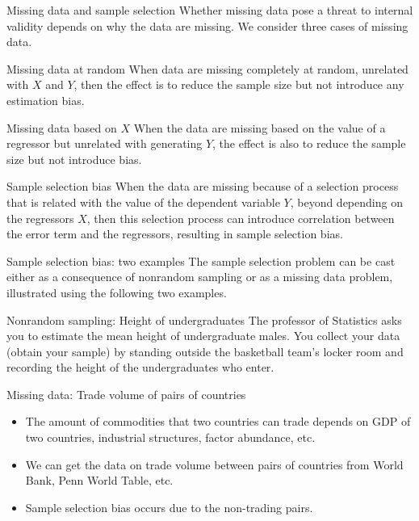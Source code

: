 \documentclass[presentation,10pt]{beamer}
\begin{document}
\begin{frame}[label={sec:orgb2cec50}]{Missing data and sample selection}
Whether missing data pose a threat to internal validity depends on why
the data are missing. We consider three cases of missing data.

\begin{block}{Missing data at random}
When data are missing completely at random, unrelated with \(X\) and
\(Y\), then the effect is to reduce the sample size but not introduce
any estimation bias. 
\end{block}

\begin{block}{Missing data based on \(X\)}
When the data are missing based on the value of a regressor but
unrelated with generating \(Y\), the effect is also to reduce the sample
size but not introduce bias. 
\end{block}

\begin{block}{Sample selection bias}
When the data are missing because of a selection process that is
related with the value of the dependent variable \(Y\), beyond depending
on the regressors \(X\), then this selection process can introduce
correlation between the error term and the regressors, resulting in
\alert{sample selection bias}.
\end{block}
\end{frame}


\begin{frame}[label={sec:org48e4990}]{Sample selection bias: two examples}
The sample selection problem can be cast either as a consequence of
nonrandom sampling or as a missing data problem, illustrated using the
following two examples. 

\begin{block}{Nonrandom sampling: Height of undergraduates}
The professor of Statistics asks you to estimate the mean height of
undergraduate males. You collect your data (obtain your sample) by
standing outside the basketball team’s locker room and recording the
height of the undergraduates who enter.
\end{block}

\begin{block}{Missing data: Trade volume of pairs of countries}
\begin{itemize}
\item The amount of commodities that two countries can trade depends on
GDP of two countries, industrial structures, factor abundance,
etc.
\item We can get the data on trade volume between pairs of countries
from World Bank, Penn World Table, etc.
\item Sample selection bias occurs due to the non-trading pairs.
\end{itemize}
\end{block}
\end{frame}
\end{document}

